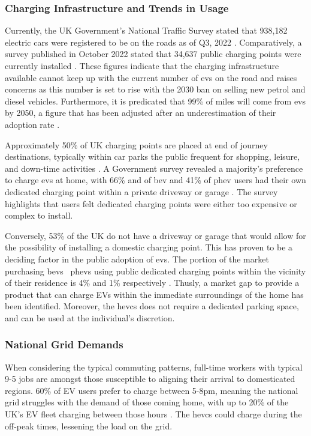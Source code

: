 \documentclass [12pt]{article}
\begin{document}
\subsubsection{Charging Infrastructure and Trends in Usage}

Currently, the UK Government’s National Traffic Survey stated that 938,182 electric cars were registered to be on the roads as of Q3, 2022 \cite{Q32022}. Comparatively, a survey published in October 2022 stated that 34,637 public charging points were currently installed \cite{chargestats}. These figures indicate that the charging infrastructure available cannot keep up with the current number of \gls{ev}s on the road and raises concerns as this number is set to rise with the 2030 ban on selling new petrol and diesel vehicles. Furthermore, it is predicated that 99\% of miles will come from \gls{ev}s by 2050, a figure that has been adjusted after an underestimation of their adoption rate \cite{2050rates}.

Approximately 50\% of UK charging points are placed at end of journey destinations, typically within car parks the public frequent for shopping, leisure, and down-time activities \cite{chargestats}. A Government survey revealed a majority's preference to charge \gls{ev}s at home, with 66\% and of \gls{bev} and 41\% of \gls{phev} users had their own dedicated charging point within a private driveway or garage \cite{homecharge}. The survey highlights that users felt dedicated charging points were either too expensive or complex to install.

Conversely, 53\% of the UK do not have a driveway or garage that would allow for the possibility of installing a domestic charging point. This has proven to be a deciding factor in the public adoption of \gls{ev}s. The portion of the market purchasing \gls{bev}s \ \gls{phev}s using public dedicated charging points within the vicinity of their residence is 4\% and 1\% respectively \cite{chargestats}. Thusly, a market gap to provide a product that can charge EVs within the immediate surroundings of the home has been identified. Moreover, the \gls{hevcs} does not require a dedicated parking space, and can be used at the individual's discretion.

\subsubsection{National Grid Demands}

When considering the typical commuting patterns, full-time workers with typical 9-5 jobs are amongst those susceptible to aligning their arrival to domesticated regions. 60\% of EV users prefer to charge between 5-8pm, meaning the national grid struggles with the demand of those coming home, with up to 20\% of the UK's EV fleet charging between those hours \cite{chargestats}. The \gls{hevcs} could charge during the off-peak times, lessening the load on the grid.
\end{document}
